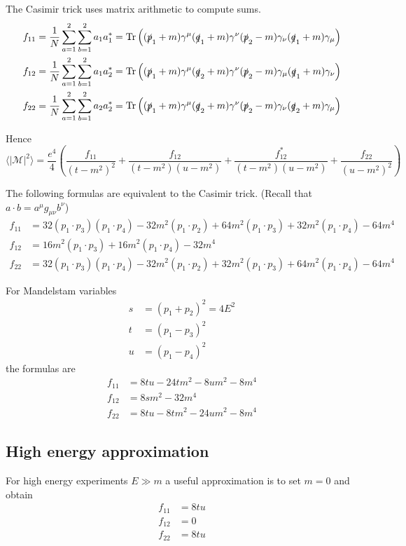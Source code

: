 \documentclass[12pt]{article}
\begin{document}
The Casimir trick uses matrix arithmetic to compute sums.
\begin{align*}
f_{11}&=\frac{1}{N} \sum_{a=1}^2\sum_{b=1}^2 a_1a_1^*=\mathop{\rm Tr}
\left(
(\slashed{p}_1+m)\gamma^\mu(\slashed{q}_1+m)\gamma^\nu(\slashed{p}_2-m)\gamma_\nu(\slashed{q}_1+m)\gamma_\mu
\right)
\\
f_{12}&=\frac{1}{N} \sum_{a=1}^2\sum_{b=1}^2 a_1a_2^*=\mathop{\rm Tr}
\left(
(\slashed{p}_1+m)\gamma^\mu(\slashed{q}_2+m)\gamma^\nu(\slashed{p}_2-m)\gamma_\mu(\slashed{q}_1+m)\gamma_\nu
\right)
\\
f_{22}&=\frac{1}{N} \sum_{a=1}^2\sum_{b=1}^2 a_2a_2^*=\mathop{\rm Tr}
\left(
(\slashed{p}_1+m)\gamma^\mu(\slashed{q}_2+m)\gamma^\nu(\slashed{p}_2-m)\gamma_\nu(\slashed{q}_2+m)\gamma_\mu
\right)
\end{align*}

Hence
\begin{equation*}
\langle|\mathcal{M}|^2\rangle
=
\frac{e^4}{4}
\left(
\frac{f_{11}}{(t-m^2)^2}
+\frac{f_{12}}{(t-m^2)(u-m^2)}
+\frac{f_{12}^*}{(t-m^2)(u-m^2)}
+\frac{f_{22}}{(u-m^2)^2}
\right)
\end{equation*}

The following formulas are equivalent to the Casimir trick.
(Recall that $a\cdot b=a^\mu g_{\mu\nu}b^\nu$)
\begin{align*}
f_{11}&=
 32 (p_1 \cdot p_3) (p_1 \cdot p_4) -
 32 m^2 (p_1 \cdot p_2) +
 64 m^2 (p_1 \cdot p_3) +
 32 m^2 (p_1 \cdot p_4) - 64 m^4
\\
f_{12}&=
 16 m^2 (p_1 \cdot p_3) +
 16 m^2 (p_1 \cdot p_4) - 32 m^4
\\
f_{22}&=
 32 (p_1 \cdot p_3) (p_1 \cdot p_4) -
 32 m^2 (p_1 \cdot p_2) +
 32 m^2 (p_1 \cdot p_3) +
 64 m^2 (p_1 \cdot p_4) - 64 m^4
\end{align*}

For Mandelstam variables
\begin{align*}
s&=(p_1+p_2)^2=4E^2
\\
t&=(p_1-p_3)^2
\\
u&=(p_1-p_4)^2
\end{align*}
the formulas are
\begin{align*}
f_{11}&=8 t u - 24 t m^2 - 8 u m^2 - 8 m^4
\\
f_{12}&=8 s m^2 - 32 m^4
\\
f_{22}&=8 t u - 8 t m^2 - 24 u m^2 - 8 m^4
\end{align*}

\subsection*{High energy approximation}
For high energy experiments $E\gg m$ a useful approximation is to set $m=0$ and obtain
\begin{align*}
f_{11}&=8tu
\\
f_{12}&=0
\\
f_{22}&=8tu
\end{align*}
\end{document}

